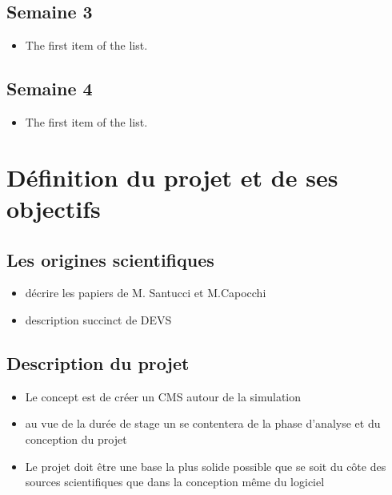\documentclass{rapport_stage}
\begin{document}
\section*{Semaine 3}

\begin{itemize}[label=$\bullet$]
  \item The first item of the list.
\end{itemize}

\section*{Semaine 4}

\begin{itemize}[label=$\bullet$]
  \item The first item of the list.
\end{itemize}

\chapter{Définition du projet et de ses objectifs}

\section{Les origines scientifiques}

\begin{itemize}[label=$\bullet$]
  \item décrire les papiers de M. Santucci et M.Capocchi \cite{capocchi_devs_2022} \cite{capocchi_towards_2023}
  \item description succinct de DEVS
\end{itemize}

\section{Description du projet}

\begin{itemize}[label=$\bullet$]
  \item Le concept est de créer un CMS autour de la simulation
  \item au vue de la durée de stage un se contentera de la phase d'analyse et du conception du projet
  \item Le projet doit être une base la plus solide possible que se soit du côte des sources scientifiques que dans la conception même du logiciel
\end{itemize}
\end{document}
